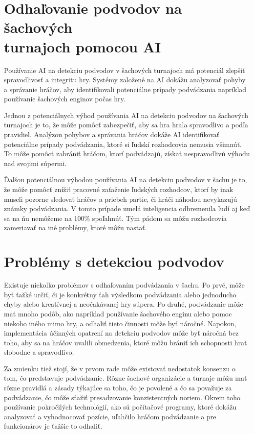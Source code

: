 \documentclass[10pt,oneside,slovak,a4paper]{article}
\begin{document}
\section{Odhaľovanie podvodov na šachových\\
	 turnajoch pomocou AI}

Používanie AI na detekciu podvodov v šachových turnajoch má potenciál zlepšiť spravodlivosť a integritu hry. Systémy založené na AI dokážu analyzovať pohyby a správanie hráčov, aby identifikovali potenciálne prípady podvádzania napríklad používanie šachových enginov počas hry.

Jednou z potenciálnych výhod používania AI na detekciu podvodov na šachových turnajoch je to, že môže pomôcť zabezpečiť, aby sa hra hrala spravodlivo a podľa pravidiel. Analýzou pohybov a správania hráčov dokáže AI identifikovať potenciálne prípady podvádzania, ktoré si ľudskí rozhodcovia nemusia všimnúť. To môže pomôcť zabrániť hráčom, ktorí podvádzajú, získať nespravodlivú výhodu nad svojimi súpermi.

Ďalšou potenciálnou výhodou používania AI na detekciu podvodov v šachu je to, že môže pomôcť znížiť pracovné zaťaženie ľudských rozhodcov, ktorí by inak museli pozorne sledovať hráčov a priebeh partie, či hráči náhodou nevykazujú známky podvádzania. V tomto prípade umelá inteligencia odbremenila ľudí aj keď sa na ňu nemôžeme na 100\% spoľahnúť. Tým pádom sa môžu rozhodcovia zameriavať na iné problémy, ktoré môžu nastať.

\section{Problémy s detekciou podvodov}

Existuje niekoľko problémov s odhaľovaním podvádzania v šachu. Po prvé, môže byť ťažké určiť, či je konkrétny ťah výsledkom podvádzania alebo jednoducho chyby alebo kreatívnej a neočakávanej hry súpera. Po druhé, podvádzanie môže mať mnoho podôb, ako napríklad používanie šachového enginu alebo pomoc niekoho iného mimo hry, a odhaliť tieto činnosti môže byť náročné. Napokon, implementácia účinných opatrení na detekciu podvodov môže byť náročná bez toho, aby sa na hráčov uvalili obmedzenia, ktoré môžu brániť ich schopnosti hrať slobodne a spravodlivo.

Za zmienku tiež stojí, že v prvom rade môže existovať nedostatok konsenzu o tom, čo predstavuje podvádzanie. Rôzne šachové organizácie a turnaje môžu mať rôzne pravidlá a zásady týkajúce sa toho, čo je povolené a čo sa považuje za podvádzanie, čo môže sťažiť presadzovanie konzistentných noriem. Okrem toho používanie pokročilých technológií, ako sú počítačové programy, ktoré dokážu analyzovať a vyhodnocovať pozície, uľahčilo hráčom podvádzanie a pre funkcionárov je ťažšie to odhaliť.
\end{document}
